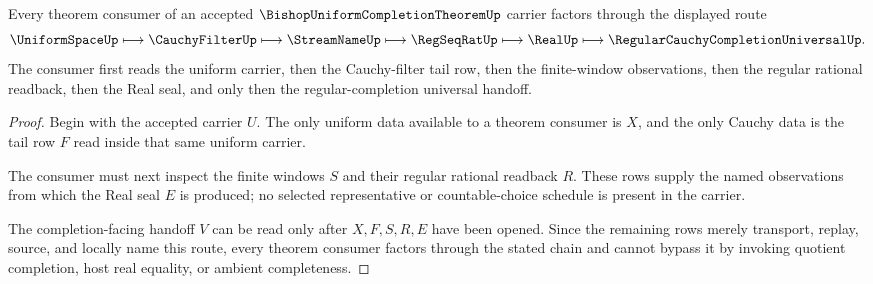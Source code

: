 \begin{theorem}
\label{thm:bishop-uniform-completion-theorem-uniform-handoff}
Every theorem consumer of an accepted $\BishopUniformCompletionTheoremUp$ carrier factors through the displayed route
$$
\UniformSpaceUp \longmapsto \CauchyFilterUp \longmapsto \StreamNameUp \longmapsto \RegSeqRatUp \longmapsto \RealUp \longmapsto \RegularCauchyCompletionUniversalUp.
$$
The consumer first reads the uniform carrier, then the Cauchy-filter tail row, then the finite-window observations, then the regular rational readback, then the Real seal, and only then the regular-completion universal handoff.
\end{theorem}
\begin{proof}
Begin with the accepted carrier $U$. The only uniform data available to a theorem consumer is $X$, and the only Cauchy data is the tail row $F$ read inside that same uniform carrier.

The consumer must next inspect the finite windows $S$ and their regular rational readback $R$. These rows supply the named observations from which the Real seal $E$ is produced; no selected representative or countable-choice schedule is present in the carrier.

The completion-facing handoff $V$ can be read only after $X,F,S,R,E$ have been opened. Since the remaining rows merely transport, replay, source, and locally name this route, every theorem consumer factors through the stated chain and cannot bypass it by invoking quotient completion, host real equality, or ambient completeness.
\end{proof}




